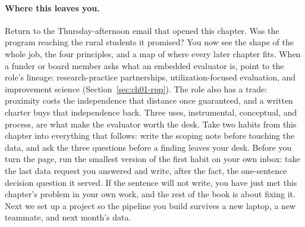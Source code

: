 \paragraph{Where this leaves you.} Return to the Thursday-afternoon email that opened this chapter. Was the program reaching the rural students it promised? You now see the shape of the whole job, the four principles, and a map of where every later chapter fits. When a funder or board member asks what an embedded evaluator is, point to the role's lineage: research-practice partnerships, utilization-focused evaluation, and improvement science (Section~\ref{sec:ch01-rpp}). The role also has a trade: proximity costs the independence that distance once guaranteed, and a written charter buys that independence back. Three uses, instrumental, conceptual, and process, are what make the evaluator worth the desk. Take two habits from this chapter into everything that follows: write the scoping note before touching the data, and ask the three questions before a finding leaves your desk. Before you turn the page, run the smallest version of the first habit on your own inbox: take the last data request you answered and write, after the fact, the one-sentence decision question it served. If the sentence will not write, you have just met this chapter's problem in your own work, and the rest of the book is about fixing it. Next we set up a project so the pipeline you build survives a new laptop, a new teammate, and next month's data.

